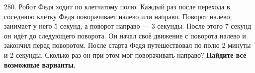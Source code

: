 280. Робот Федя ходит по клетчатому полю. Каждый раз после перехода в соседнюю клетку Федя поворачивает налево или направо. Поворот налево занимает у него 5 секунд, а поворот направо --- 3 секунды. После этого 7 секунд он идёт до следующего поворота. Он начал своё движение с поворота налево и закончил перед поворотом. После старта Федя путешествовал по полю 2 минуты и 2 секунды. Сколько раз он при этом мог поворачивать направо? {\textbf {Найдите все возможные варианты.}}\\
